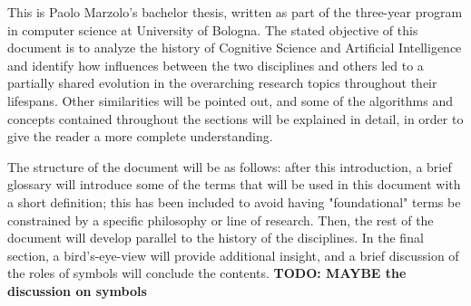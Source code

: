 \documentclass[../main.tex]{subfiles}
\begin{document}
This is Paolo Marzolo's bachelor thesis, written as part of the three-year program in computer science at University of Bologna. The stated objective of this document is to analyze the history of Cognitive Science and Artificial Intelligence and identify how influences between the two disciplines and others led to a partially shared evolution in the overarching research topics throughout their lifespans. Other similarities will be pointed out, and some of the algorithms and concepts contained throughout the sections will be explained in detail, in order to give the reader a more complete understanding.

The structure of the document will be as follows: after this introduction, a brief glossary will introduce some of the terms that will be used in this document with a short definition; this has been included to avoid having "foundational" terms be constrained by a specific philosophy or line of research. Then, the rest of the document will develop parallel to the history of the disciplines. In the final section, a bird's-eye-view will provide additional insight, and a brief discussion of the roles of symbols will conclude the contents. \textbf{TODO: MAYBE the discussion on symbols}
\end{document}
